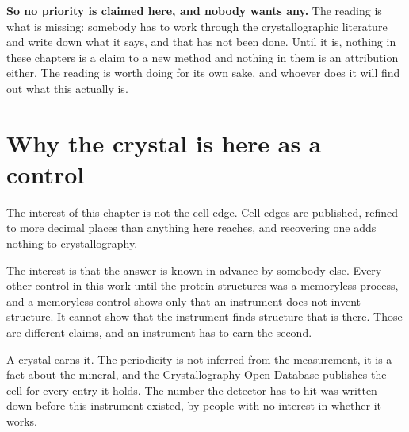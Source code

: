 \textbf{So no priority is claimed here, and nobody wants any.} The reading is what is missing: somebody has to work through the crystallographic literature and write down what it says, and that has not been done. Until it is, nothing in these chapters is a claim to a new method and nothing in them is an attribution either. The reading is worth doing for its own sake, and whoever does it will find out what this actually is.

\section{Why the crystal is here as a control}

The interest of this chapter is not the cell edge. Cell edges are published, refined to more decimal places than anything here reaches, and recovering one adds nothing to crystallography.

The interest is that the answer is known in advance by somebody else. Every other control in this work until the protein structures was a memoryless process, and a memoryless control shows only that an instrument does not invent structure. It cannot show that the instrument finds structure that is there. Those are different claims, and an instrument has to earn the second.

A crystal earns it. The periodicity is not inferred from the measurement, it is a fact about the mineral, and the Crystallography Open Database publishes the cell for every entry it holds. The number the detector has to hit was written down before this instrument existed, by people with no interest in whether it works.
